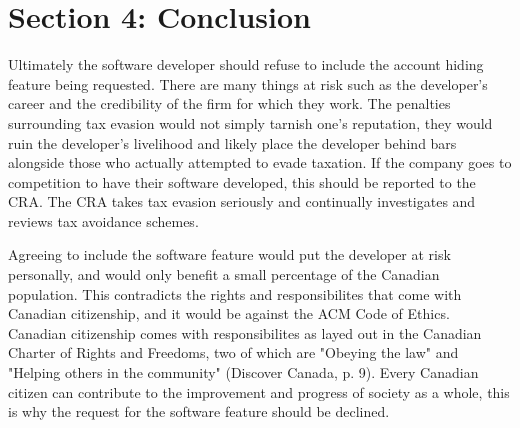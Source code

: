 \section{Section 4: Conclusion}
Ultimately the software developer should refuse to include the account hiding feature being requested. There are many things at risk such as the developer's career and the credibility of the firm for which they work. The penalties surrounding tax evasion would not simply tarnish one's reputation, they would ruin the developer's livelihood and likely place the developer behind bars alongside those who actually attempted to evade taxation. If the company goes to competition to have their software developed, this should be reported to the CRA. The CRA takes tax evasion seriously and continually investigates and reviews tax avoidance schemes. 

Agreeing to include the software feature would put the developer at risk personally, and would only benefit a small percentage of the Canadian population. This contradicts the rights and responsibilites that come with Canadian citizenship, and it would be against the ACM Code of Ethics. Canadian citizenship comes with responsibilites as layed out in the Canadian Charter of Rights and Freedoms, two of which are "Obeying the law" and "Helping others in the community" (Discover Canada, p. 9). Every Canadian citizen can contribute to the improvement and progress of society as a whole, this is why the request for the software feature should be declined. 
